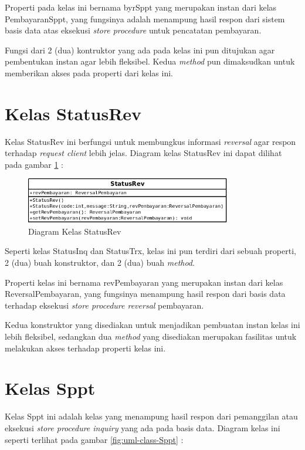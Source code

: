 Properti pada kelas ini bernama byrSppt yang merupakan instan dari kelas PembayaranSppt, yang fungsinya adalah menampung hasil respon dari sistem basis data atas eksekusi \textit{store procedure} untuk pencatatan pembayaran.

Fungsi dari 2 (dua) kontruktor yang ada pada kelas ini pun ditujukan agar pembentukan instan agar lebih fleksibel. Kedua \textit{method} pun dimaksudkan untuk memberikan akses pada properti dari kelas ini.

\section{Kelas StatusRev}

Kelas StatusRev ini berfungsi untuk membungkus informasi \textit{reversal} agar respon terhadap \textit{request client} lebih jelas. Diagram kelas StatusRev ini dapat dilihat pada gambar \ref{fig:uml-class-StatusRev} :

\begin{figure}[H]
  \centering
  \includegraphics[width=0.8\textwidth]{./resources/uml/uml-class-StatusRev}
  \caption{Diagram Kelas StatusRev}
  \label{fig:uml-class-StatusRev}
\end{figure}

Seperti kelas StatusInq dan StatusTrx, kelas ini pun terdiri dari sebuah properti, 2 (dua) buah konstruktor, dan 2 (dua) buah \textit{method}. 

Properti kelas ini bernama revPembayaran yang merupakan instan dari kelas ReversalPembayaran, yang fungsinya menampung hasil respon dari basis data terhadap eksekusi \textit{store procedure reversal} pembayaran.

Kedua konstruktor yang disediakan untuk menjadikan pembuatan instan kelas ini lebih fleksibel, sedangkan dua \textit{method} yang disediakan merupakan fasilitas untuk melakukan akses terhadap properti kelas ini.

\section{Kelas Sppt}

Kelas Sppt ini adalah kelas yang menampung hasil respon dari pemanggilan atau eksekusi \textit{store procedure inquiry} yang ada pada basis data. Diagram kelas ini seperti terlihat pada gambar \ref{fig:uml-class-Sppt} :

